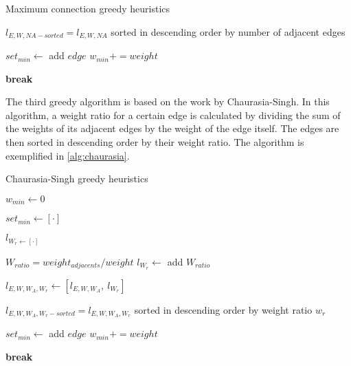 \begin{algorithm}
\caption{Maximum connection greedy heuristics}
\label{alg:max-connection}
\begin{algorithmic}


\State $l_{E,W,NA-sorted} = l_{E,W,NA}$ sorted in descending order by number of adjacent edges

    \State $set_{min} \gets$ add $edge$
    \State $w_{min} += weight$

        \State \textbf{break}
    \EndIf
\EndFor
\end{algorithmic}
\end{algorithm}

The third greedy algorithm is based on the work by Chaurasia-Singh\cite{chaurasia}.
In this algorithm, a weight ratio for a certain edge is calculated by dividing the sum of the weights of its adjacent edges by the weight of the edge itself.
The edges are then sorted in descending order by their weight ratio.
The algorithm is exemplified in \autoref{alg:chaurasia}.


\begin{algorithm}
\caption{Chaurasia-Singh greedy heuristics}
\label{alg:chaurasia}
\begin{algorithmic}

$w_{min} \gets 0$

$set_{min} \gets [\cdot]$

$l_{W_{r} \gets [\cdot]}$

    
    $W_{ratio} = weight_{adjacents} / weight$
    \State $l_{W_{r}} \gets$ add $W_{ratio}$

\EndFor

\State $l_{E,W,W_{A},W_{r}} \gets [l_{E,W,W_{A}},\ l_{W_{r}}]$

\State $l_{E,W,W_{A},W_{r}-sorted} = l_{E,W, W_{A}, W_{r}}$ sorted in descending order by weight ratio $w_r$

    \State $set_{min} \gets$ add $edge$
    \State $w_{min} += weight$

        \State \textbf{break}
    \EndIf
\EndFor
\end{algorithmic}
\end{algorithm}
